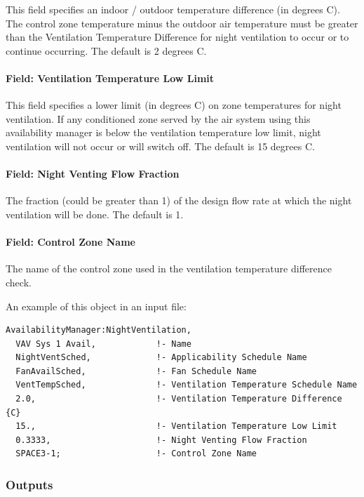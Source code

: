 This field specifies an indoor / outdoor temperature difference (in degrees C). The control zone temperature minus the outdoor air temperature must be greater than the Ventilation Temperature Difference for night ventilation to occur or to continue occurring. The default is 2 degrees C.

\paragraph{Field: Ventilation Temperature Low Limit}\label{field-ventilation-temperature-low-limit}

This field specifies a lower limit (in degrees C) on zone temperatures for night ventilation. If any conditioned zone served by the air system using this availability manager is below the ventilation temperature low limit, night ventilation will not occur or will switch off. The default is 15 degrees C.

\paragraph{Field: Night Venting Flow Fraction}\label{field-night-venting-flow-fraction}

The fraction (could be greater than 1) of the design flow rate at which the night ventilation will be done. The default is 1.

\paragraph{Field: Control Zone Name}\label{field-control-zone-name-000}

The name of the control zone used in the ventilation temperature difference check.

An example of this object in an input file:

\begin{lstlisting}
AvailabilityManager:NightVentilation,
  VAV Sys 1 Avail,            !- Name
  NightVentSched,             !- Applicability Schedule Name
  FanAvailSched,              !- Fan Schedule Name
  VentTempSched,              !- Ventilation Temperature Schedule Name
  2.0,                        !- Ventilation Temperature Difference   {C}
  15.,                        !- Ventilation Temperature Low Limit
  0.3333,                     !- Night Venting Flow Fraction
  SPACE3-1;                   !- Control Zone Name
\end{lstlisting}

\subsubsection{Outputs}\label{outputs-8-008}

